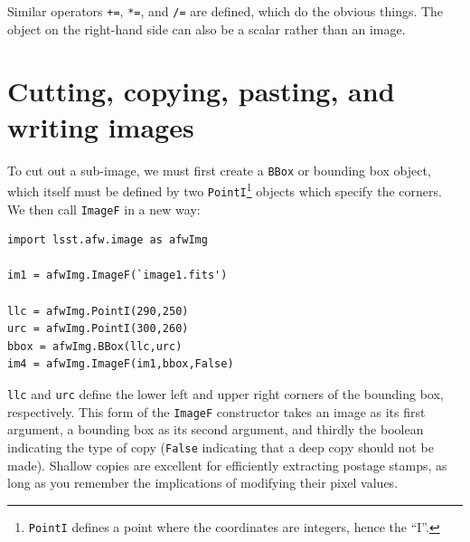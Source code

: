 
Similar operators \texttt{+=}, \texttt{*=}, and \texttt{/=} are
defined, which do the obvious things.  The object on the right-hand
side can also be a scalar rather than an image.

\section{Cutting, copying, pasting, and writing images}

To cut out a sub-image, we must first create a \texttt{BBox} or
bounding box object, which itself must be defined by two
\texttt{PointI}\footnote{\texttt{PointI} defines a point where the
 coordinates are integers, hence the ``I''.}  objects which specify
the corners.  We then call \texttt{ImageF} in a new way:

\begin{verbatim}
import lsst.afw.image as afwImg

im1 = afwImg.ImageF(`image1.fits')

llc = afwImg.PointI(290,250)
urc = afwImg.PointI(300,260)
bbox = afwImg.BBox(llc,urc)
im4 = afwImg.ImageF(im1,bbox,False)
\end{verbatim}

\texttt{llc} and \texttt{urc} define the lower left and upper right
corners of the bounding box, respectively.  This form of the
\texttt{ImageF} constructor takes an image as its first argument, a
bounding box as its second argument, and thirdly the boolean
indicating the type of copy (\texttt{False} indicating that a deep
copy should not be made).  Shallow copies are excellent for
efficiently extracting postage stamps, as long as you remember the
implications of modifying their pixel values.

